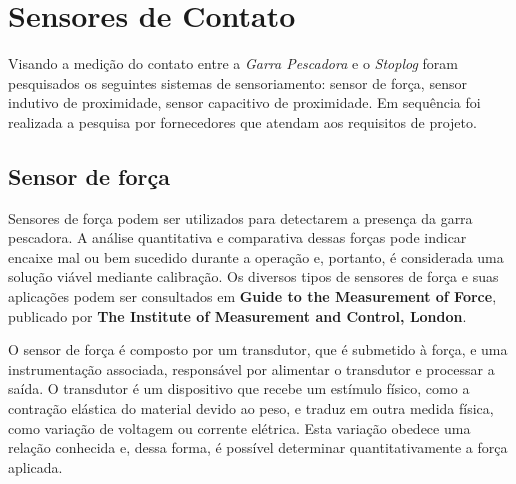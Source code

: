 





\section{Sensores de Contato}

Visando a medição do contato entre a \emph{Garra Pescadora} e o \emph{Stoplog} foram pesquisados os seguintes sistemas de sensoriamento: sensor de força, sensor indutivo de proximidade,  sensor capacitivo de proximidade. Em sequência foi realizada a
 pesquisa por fornecedores que atendam aos requisitos de projeto.
 


\subsection{Sensor de força}

 Sensores de força podem ser utilizados para detectarem a presença da garra pescadora. A análise quantitativa e comparativa dessas forças pode indicar encaixe mal ou bem sucedido durante a operação e, portanto, é considerada uma solução viável mediante calibração. Os diversos tipos de sensores de força e suas aplicações podem ser consultados em \textbf{Guide to the Measurement of Force}, publicado por \textbf{The Institute of Measurement and Control, London}.

 O sensor de força é composto por um transdutor, que é submetido à força, e uma instrumentação associada, responsável por alimentar o transdutor e processar a saída. O transdutor é um dispositivo que recebe um estímulo físico, como a contração elástica do material devido ao peso, e traduz em outra medida física, como variação de voltagem ou corrente elétrica. Esta variação obedece uma relação conhecida e, dessa forma, é possível determinar quantitativamente a força aplicada.

